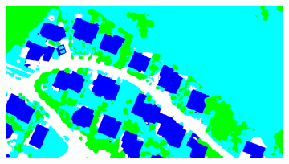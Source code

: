 \begin{figure}[htb]
\begin{subfigure}{0.24\textwidth}
 \end{subfigure}
 \begin{subfigure}{0.24\textwidth}
   \centering
   \includegraphics[width=1\linewidth]{fig/vai/17_auto.png}
 \end{subfigure}
 

\end{figure}
